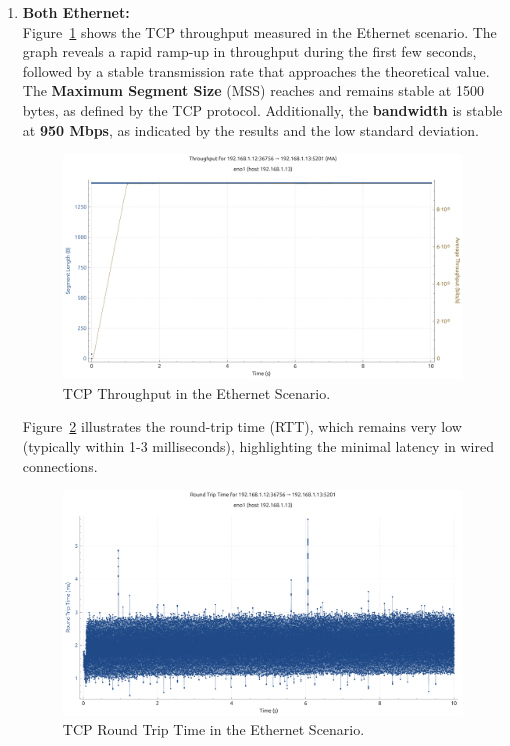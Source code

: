         \begin{enumerate}

            \item \textbf{Both Ethernet:} \\
                Figure~\ref{fig:throughput-eth-tcp} shows the TCP throughput measured in the Ethernet scenario. The graph reveals a rapid ramp-up in throughput during the first few seconds, followed by a stable transmission rate that approaches the theoretical value. The \textbf{Maximum Segment Size} (MSS) reaches and remains stable at 1500 bytes, as defined by the TCP protocol. Additionally, the \textbf{bandwidth} is stable at \textbf{950 Mbps}, as indicated by the results and the low standard deviation.              
                \begin{figure}[ht]
                    \centering
                    \includegraphics[width=0.9\columnwidth]{images/graphs/Throughput/Throughput_ETH_TCP.pdf}
                    \caption{TCP Throughput in the Ethernet Scenario.}
                    \label{fig:throughput-eth-tcp}
                \end{figure}

                Figure~\ref{fig:rtt-eth-tcp} illustrates the round-trip time (RTT), which remains very low (typically within 1-3 milliseconds), highlighting the minimal latency in wired connections. 
                
                \begin{figure}[ht]
                    \centering
                    \includegraphics[width=0.9\columnwidth]{images/graphs/RTT/RTT_ETH_TCP.pdf}
                    \caption{TCP Round Trip Time in the Ethernet Scenario.}
                    \label{fig:rtt-eth-tcp}
                \end{figure}


\end{enumerate}

